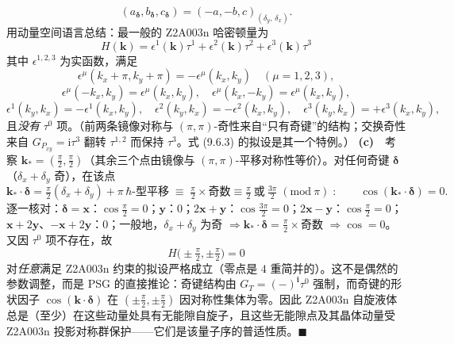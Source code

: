 \begin{equation*}
(a_{\pmb{\delta}},b_{\pmb{\delta}},c_{\pmb{\delta}})=(-a,-b,c)_{( \delta_y,\,\delta_x)} .
\end{equation*}
用动量空间语言总结：最一般的 Z2A003n 哈密顿量为
\begin{equation*}
\boxed{\;H(\pmb{k})=\epsilon^{1}(\pmb{k})\tau^{1}+\epsilon^{2}(\pmb{k})\tau^{2}+\epsilon^{3}(\pmb{k})\tau^{3}\;}
\end{equation*}
其中 $\epsilon^{1,2,3}$ 为实函数，满足
\begin{equation*}
\epsilon^{\mu}(k_x+\pi,k_y+\pi)=-\epsilon^{\mu}(k_x,k_y)\quad(\mu=1,2,3),
\end{equation*}
\begin{equation*}
\epsilon^{\mu}(-k_x,k_y)=\epsilon^{\mu}(k_x,k_y),\quad
\epsilon^{\mu}(k_x,-k_y)=\epsilon^{\mu}(k_x,k_y),
\end{equation*}
\begin{equation*}
\epsilon^{1}(k_y,k_x)=-\epsilon^{1}(k_x,k_y),\quad
\epsilon^{2}(k_y,k_x)=-\epsilon^{2}(k_x,k_y),\quad
\epsilon^{3}(k_y,k_x)=+\epsilon^{3}(k_x,k_y),
\end{equation*}
且\emph{没有} $\tau^0$ 项。（前两条镜像对称与 $(\pi,\pi)$-奇性来自“只有奇键”的结构；交换奇性来自 $G_{P_{xy}}=\mathrm{i}\tau^3$ 翻转 $\tau^{1,2}$ 而保持 $\tau^3$。式 (9.6.3) 的拟设是其一个特例。）
\textbf{(c)}　考察 $\pmb{k}_{*}=(\tfrac{\pi}{2},\tfrac{\pi}{2})$（其余三个点由镜像与 $(\pi,\pi)$-平移对称性等价）。对任何奇键 $\pmb{\delta}$（$\delta_x+\delta_y$ 奇），在该点
\begin{equation*}
\pmb{k}_{*}\cdot\pmb{\delta}=\tfrac{\pi}{2}(\delta_x+\delta_y)+\pi\,\hbar\text{-型平移}
\;\equiv\;\tfrac{\pi}{2}\!\times\!\text{奇数}\equiv\tfrac{\pi}{2}\ \text{或}\ \tfrac{3\pi}{2}\;(\mathrm{mod}\ \pi)\;:\qquad
\cos(\pmb{k}_{*}\cdot\pmb{\delta})=0 .
\end{equation*}
逐一核对：$\pmb{\delta}=\pmb{x}$：$\cos\tfrac{\pi}{2}=0$；$\pmb{y}$：$0$；$2\pmb{x}+\pmb{y}$：$\cos\tfrac{3\pi}{2}=0$；$2\pmb{x}-\pmb{y}$：$\cos\tfrac{\pi}{2}=0$；$\pmb{x}+2\pmb{y}$、$-\pmb{x}+2\pmb{y}$：$0$；一般地，$\delta_x+\delta_y$ 为奇 $\Rightarrow \pmb{k}_*\cdot\pmb{\delta}=\tfrac{\pi}{2}\times$奇数 $\Rightarrow \cos=0$。又因 $\tau^0$ 项不存在，故
\begin{equation*}
\boxed{\;H\big(\pm\tfrac{\pi}{2},\pm\tfrac{\pi}{2}\big)=0\;}
\end{equation*}
对\emph{任意}满足 Z2A003n 约束的拟设严格成立（零点是 $4$ 重简并的）。这不是偶然的参数调整，而是 PSG 的直接推论：奇键结构由 $G_T=(-)^{\pmb{i}}\tau^0$ 强制，而奇键的形状因子 $\cos(\pmb{k}\cdot\pmb{\delta})$ 在 $(\pm\tfrac{\pi}{2},\pm\tfrac{\pi}{2})$ 因对称性集体为零。因此 Z2A003n 自旋液体总是（至少）在这些动量处具有无能隙自旋子，且这些无能隙点及其晶体动量受 Z2A003n 投影对称群保护——它们是该量子序的普适性质。$\blacksquare$





